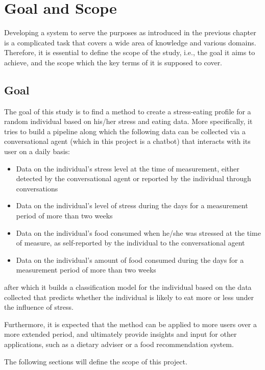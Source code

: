 
\chapter{Goal and Scope}\label{chapter:goal_req}
Developing a system to serve the purposes as introduced in the previous chapter is a complicated task that covers a wide area of knowledge and various domains. Therefore, it is essential to define the scope of the study, i.e., the goal it aims to achieve, and the scope which the key terms of it is supposed to cover.

\section{Goal}
The goal of this study is to find a method to create a stress-eating profile for a random individual based on his/her stress and eating data. More specifically, it tries to build a pipeline along which the following data can be collected via a conversational agent (which in this project is a chatbot) that interacts with its user on a daily basis:
\begin{itemize}
    \item Data on the individual’s stress level at the time of measurement, either detected by the conversational agent or reported by the individual through conversations
    \item Data on the individual’s level of stress during the days for a measurement period of more than two weeks
    \item Data on the individual’s food consumed when he/she was stressed at the time of measure, as self-reported by the individual to the conversational agent
    \item Data on the individual’s amount of food consumed during the days for a measurement period of more than two weeks
\end{itemize}
after which it builds a classification model for the individual based on the data collected that predicts whether the individual is likely to eat more or less under the influence of stress.

Furthermore, it is expected that the method can be applied to more users over a more extended period, and ultimately provide insights and input for other applications, such as a dietary adviser or a food recommendation system.

The following sections will define the scope of this project.

